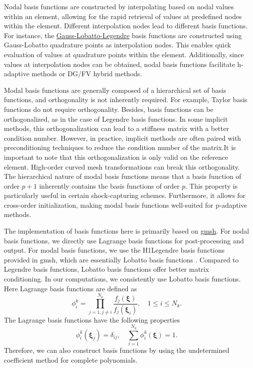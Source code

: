 \documentclass{develop-note}
\begin{document}
Nodal basis functions are constructed by interpolating based on nodal values within an element, allowing for the rapid retrieval of values at predefined nodes within the element. Different interpolation nodes lead to different basis functions. For instance, the \href{https://docs.fenicsproject.org/dolfinx/main/python/demos/demo_lagrange_variants.html}{Gauss-Lobatto-Legendre} basis functions are constructed using Gauss-Lobatto quadrature points as interpolation nodes. This enables quick evaluation of values at quadrature points within the element. Additionally, since values at interpolation nodes can be obtained, nodal basis functions facilitate h-adaptive methods or DG/FV hybrid methods.

Modal basis functions are generally composed of a hierarchical set of basis functions, and orthogonality is not inherently required. For example, Taylor basis functions do not require orthogonality. Besides, basis functions can be orthogonalized, as in the case of Legendre basis functions. In some implicit methods, this orthogonalization can lead to a stiffness matrix with a better condition number. However, in practice, implicit methods are often paired with preconditioning techniques to reduce the condition number of the matrix.It is important to note that this orthogonalization is only valid on the reference element. High-order curved mesh transformations can break this orthogonality. The hierarchical nature of modal basis functions means that a basis function of order $p+1$ inherently contains the basis functions of order $p$. This property is particularly useful in certain shock-capturing schemes. Furthermore, it allows for cross-order initialization, making modal basis functions well-suited for p-adaptive methods.

The implementation of basis functions here is primarily based on \href{https://gmsh.info}{gmsh}. For nodal basis functions, we directly use Lagrange basis functions for post-processing and output. For modal basis functions, we use the H1Legendre basis functions provided in gmsh, which are essentially Lobatto basis functions \cite{solinHigherOrderFiniteElement2003}. Compared to Legendre basis functions, Lobatto basis functions offer better matrix conditioning. In our computations, we consistently use Lobatto basis functions. Here Lagrange basis functions are defined as
\begin{equation}
  \phi_{i}^{k}=\prod_{j=1,j\neq i}^{N_{k}}\dfrac{f_{j}(\bm{\xi})}{f_{j}(\bm{\xi}_{i})},\quad 1\leqslant i\leqslant N_{k}.
\end{equation}
The Lagrange basis functions have the following properties
\begin{equation}
  \phi_{i}^{k}(\bm{\xi}_{j})=\delta_{ij},\quad \sum_{i=1}^{N_{k}}\phi_{i}^{k}(\bm{\xi})=1.
\end{equation}
Therefore, we can also construct basis functions by using the undetermined coefficient method for complete polynomials.
\end{document}
